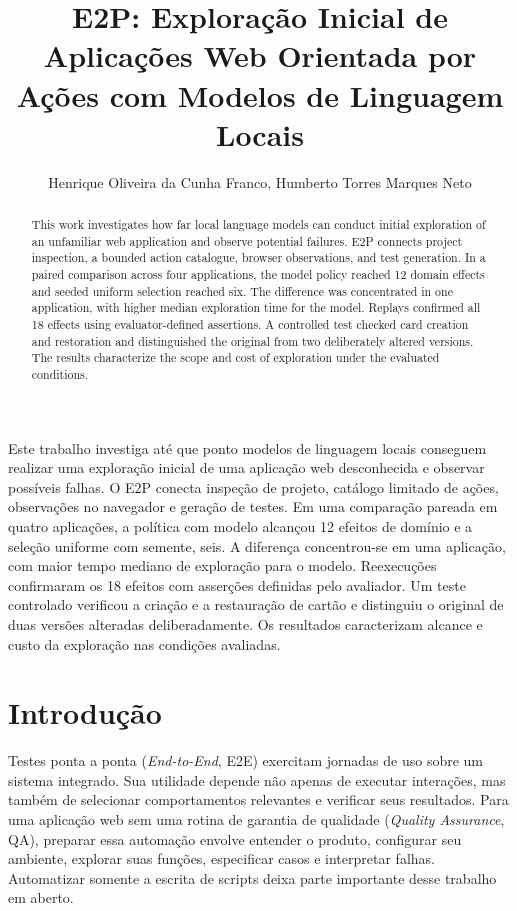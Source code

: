 \documentclass[12pt]{article}
\title{E2P: Exploração Inicial de Aplicações Web Orientada por Ações com Modelos de Linguagem Locais}
\author{Henrique Oliveira da Cunha Franco\inst{1}, Humberto Torres Marques Neto\inst{1}}
\begin{document}
\maketitle
\begin{otherlanguage}{english}
\begin{abstract}
This work investigates how far local language models can conduct initial exploration of an unfamiliar web application and observe potential failures. E2P connects project inspection, a bounded action catalogue, browser observations, and test generation. In a paired comparison across four applications, the model policy reached 12 domain effects and seeded uniform selection reached six. The difference was concentrated in one application, with higher median exploration time for the model. Replays confirmed all 18 effects using evaluator-defined assertions. A controlled test checked card creation and restoration and distinguished the original from two deliberately altered versions. The results characterize the scope and cost of exploration under the evaluated conditions.
\end{abstract}
\end{otherlanguage}
\begin{resumo}
Este trabalho investiga até que ponto modelos de linguagem locais conseguem realizar uma exploração inicial de uma aplicação web desconhecida e observar possíveis falhas. O E2P conecta inspeção de projeto, catálogo limitado de ações, observações no navegador e geração de testes. Em uma comparação pareada em quatro aplicações, a política com modelo alcançou 12 efeitos de domínio e a seleção uniforme com semente, seis. A diferença concentrou-se em uma aplicação, com maior tempo mediano de exploração para o modelo. Reexecuções confirmaram os 18 efeitos com asserções definidas pelo avaliador. Um teste controlado verificou a criação e a restauração de cartão e distinguiu o original de duas versões alteradas deliberadamente. Os resultados caracterizam alcance e custo da exploração nas condições avaliadas.
\end{resumo}

\section{Introdução}\label{sec:intro}
Testes ponta a ponta (\textit{End-to-End}, E2E) exercitam jornadas de uso sobre um sistema integrado. Sua utilidade depende não apenas de executar interações, mas também de selecionar comportamentos relevantes e verificar seus resultados. Para uma aplicação web sem uma rotina de garantia de qualidade (\textit{Quality Assurance}, QA), preparar essa automação envolve entender o produto, configurar seu ambiente, explorar suas funções, especificar casos e interpretar falhas. Automatizar somente a escrita de scripts deixa parte importante desse trabalho em aberto.
\end{document}
